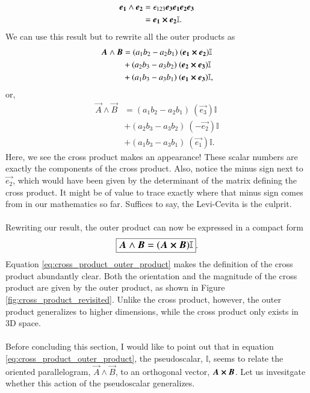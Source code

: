 \begin{align*}
    \boldsymbol{e_1} \wedge \boldsymbol{e_2} &= \epsilon_{123} \boldsymbol{e_3} \boldsymbol{e_1} \boldsymbol{e_2} \boldsymbol{e_3} \\
                    &= \boldsymbol{e_1} \cross \boldsymbol{e_2} \mathbb{I}.
\end{align*}
We can use this result but to rewrite all the outer products as 
\begin{align*}
    \boldsymbol{A}  \wedge \boldsymbol{B}   &= (a_1 b_2 - a_2 b_1) \  (\boldsymbol{e_1} \cross \boldsymbol{e_2}) \mathbb{I} \\
                &+ (a_2 b_3 - a_3 b_2) \  (\boldsymbol{e_2} \cross \boldsymbol{e_3}) \mathbb{I} \\
                &+ (a_1 b_3 - a_3 b_1 ) \ (\boldsymbol{e_1} \cross \boldsymbol{e_3}) \mathbb{I},
\end{align*}
or, 
\begin{align*}
    \vec{A}  \wedge \vec{B}   &= (a_1 b_2 - a_2 b_1) \  (\vec{e_3}) \mathbb{I} \\
                &+ (a_2 b_3 - a_3 b_2) \  (-\vec{e_2}) \mathbb{I} \\
                &+ (a_1 b_3 - a_3 b_1 ) \ (\vec{e_1}) \mathbb{I}.
\end{align*}
Here, we see the cross product makes an appearance! These scalar numbers are exactly the components of the cross product. Also, notice the minus sign next to $\vec{e_2}$, which would have been given by the determinant of the matrix defining the cross product. It might be of value to trace exactly where that minus sign comes from in our mathematics so far. Suffices to say, the Levi-Cevita is the culprit.
\\ \\ 
Rewriting our result, the outer product can now be expressed in a compact form
\begin{equation}
    \label{eq:cross_product_outer_product}
    \large\boxed{\boldsymbol{A}  \wedge \boldsymbol{B}  = (\boldsymbol{A}  \cross \boldsymbol{B} ) \mathbb{I}}.
\end{equation}
Equation \eqref{eq:cross_product_outer_product} makes the definition of the cross product abundantly clear. Both the orientation and the magnitude of the cross product are given by the outer product, as shown in Figure \ref{fig:cross_product_revisited}. Unlike the cross product, however, the outer product generalizes to higher dimensions, while the cross product only exists in 3D space.
\\ \\
Before concluding this section, I would like to point out that in equation \eqref{eq:cross_product_outer_product}, the pseudoscalar, $\mathbb{I}$, seems to relate the oriented parallelogram, $\vec{A} \wedge \vec{B}$, to an orthogonal vector, $\boldsymbol{A} \cross \boldsymbol{B}$. Let us invesitgate whether this action of the pseudoscalar generalizes.

